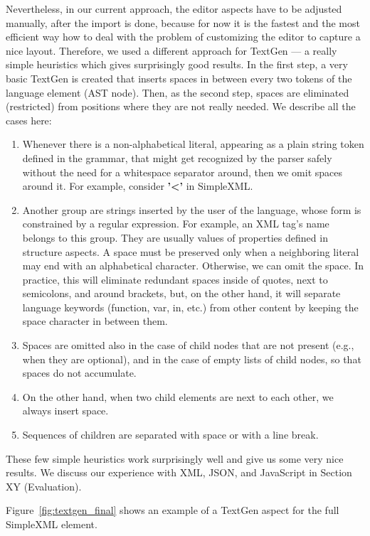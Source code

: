 Nevertheless, in our current approach, the editor aspects have to be adjusted manually, after the import is done, because for now it is the fastest and the most efficient way how to deal with the problem of customizing the editor to capture a nice layout.
Therefore, we used a different approach for TextGen --- a really simple heuristics which gives surprisingly good results.
In the first step, a very basic TextGen is created that inserts spaces in between every two tokens of the language element (AST node).
Then, as the second step, spaces are eliminated (restricted) from positions where they are not really needed.
We describe all the cases here:

\begin{enumerate}
	\item Whenever there is a non-alphabetical literal,	appearing as a plain string token defined in the grammar, that might get recognized by the parser safely without the need for a whitespace separator around, then we omit spaces around it.
		For example, consider \textbf{'\textless'} in SimpleXML.
	\item Another group are strings inserted by the user of the language, whose form is constrained by a regular expression.
		For example, an XML tag's name belongs to this group.
		They are usually values of properties defined in structure aspects.
		A space must be preserved only when a neighboring literal may end with an alphabetical character. Otherwise, we can omit the space.
		In practice, this will eliminate redundant spaces inside of quotes, next to semicolons, and around brackets, but, on the other hand, it will separate language keywords (function, var, in, etc.) from other content by keeping the space character in between them.
	\item Spaces are omitted also in the case of child nodes that are not present (e.g., when they are optional), and in the case of empty lists of child nodes, so that spaces do not accumulate.
	\item On the other hand, when two child elements are next to each other, we always insert space.
	\item Sequences of children are separated with space or with a line break.
\end{enumerate}
These few simple heuristics work surprisingly well and give us some very nice results.
We discuss our experience with XML, JSON, and JavaScript in Section XY (Evaluation).

Figure~\ref{fig:textgen_final} shows an example of a TextGen aspect for the full SimpleXML element.

